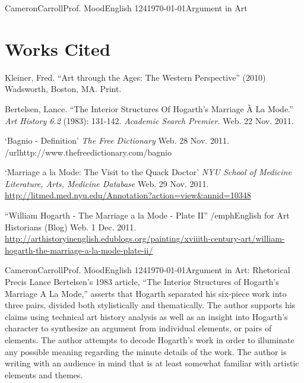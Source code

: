 \documentclass[12pt,letterpaper]{article}
\begin{document}
\begin{mla}{Cameron}{Carroll}{Prof. Mood}{English 124}{\today}{Argument in Art}
\section*{Works Cited}


Kleiner, Fred. ``Art through the Ages: The Western Perspective'' (2010) Wadsworth, Boston, MA. Print.

Bertelsen, Lance. ``The Interior Structures Of Hogarth's Marriage À La Mode.''  \emph{Art History 6.2} (1983): 131-142. \emph{Academic Search Premier.} Web. 22 Nov. 2011.

`Bagnio - Definition' \emph{The Free Dictionary} Web. 28 Nov. 2011. /url{http://www.thefreedictionary.com/bagnio}

`Marriage a la Mode: The Visit to the Quack Doctor' \emph{NYU School of Medicine Literature, Arts, Medicine Database} Web. 29 Nov. 2011. \url{http://litmed.med.nyu.edu/Annotation?action=view&annid=10348}

``William Hogarth - The Marriage a la Mode - Plate II'' /emph{English for Art Historians (Blog)} Web. 1 Dec. 2011. \url{http://arthistoryinenglish.edublogs.org/painting/xviiith-century-art/william-hogarth-the-marriage-a-la-mode-plate-ii/}

\end{mla}

\begin{mla}{Cameron}{Carroll}{Prof. Mood}{English 124}{\today}{Argument in Art: Rhetorical Precis}
Lance Bertelsen's 1983 article, ``The Interior Structures of Hogarth's Marriage A La Mode,'' asserts that Hogarth separated his six-piece work into three pairs, divided both stylistically and thematically. The author supports his claims using technical art history analysis as well as an insight into Hogarth's character to synthesize an argument from individual elements, or pairs of elements. The author attempts to decode Hogarth's work in order to illuminate any possible meaning regarding the minute details of the work. The author is writing with an audience in mind that is at least somewhat familiar with artistic elements and themes.
\end{mla}
\end{document}
